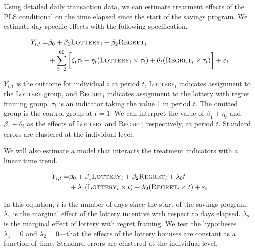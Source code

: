 \documentclass[11pt]{article}
\begin{document}
		Using detailed daily transaction data, we can estimate treatment effects of the PLS conditional on the time elapsed since the start of the savings program. We estimate day-specific effects with the following specification.

		\begin{equation} \begin{split}
		Y_{i,t} = & \beta_{0} + \beta_{1}\text{\textsc{Lottery}}_{i} + \beta_{2}\text{\textsc{Regret}}_{i} \\
					& + \sum_{t=2}^{60} \bigg [ \zeta_{t} \tau_{t} + \eta_{t}(\text{\textsc{Lottery}}_{i} \times \tau_{t}) + \theta_{t}(\text{\textsc{Regret}}_{i} \times \tau_{t}) \bigg ] + \varepsilon_{i}
		\end{split} \label{eq:timedummy} \end{equation}

		$Y_{i, t}$ is the outcome for individual $i$ at period $t$, \textsc{Lottery}$_i$ indicates assignment to the \textsc{Lottery} group, and \textsc{Regret}$_i$ indicates assignment to the lottery with regret framing group. $\tau_t$ is an indicator taking the value 1 in period $t$. The omitted group is the control group at $t=1$. We can interpret the value of $\beta_1 + \eta_t$ and $\beta_1 + \theta_t$ as the effects of \textsc{Lottery} and \textsc{Regret}, respectively, at period $t$. Standard errors are clustered at the individual level.

		We will also estimate a model that interacts the treatment indicators with a linear time trend.

		\begin{equation} \begin{split}
		Y_{i,t} = & \beta_{0} + \beta_{1}\text{\textsc{Lottery}}_{i} + \beta_{2}\text{\textsc{Regret}}_{i} + \lambda_{0}t \\
					& + \lambda_{1}(\text{\textsc{Lottery}}_{i} \times t) + \lambda_{2}(\text{\textsc{Regret}}_{i} \times t) + \varepsilon_{i}
		\end{split} \label{eq:timelinear} \end{equation}

		In this equation, $t$ is the number of days since the start of the savings program. $\lambda_1$ is the marginal effect of the lottery incentive with respect to days elapsed. $\lambda_2$ is the marginal effect of lottery with regret framing. We test the hypotheses $\lambda_1 = 0$ and $\lambda_2 = 0$---that the effects of the lottery bonuses are constant as a function of time.  Standard errors are clustered at the individual level.
\end{document}
